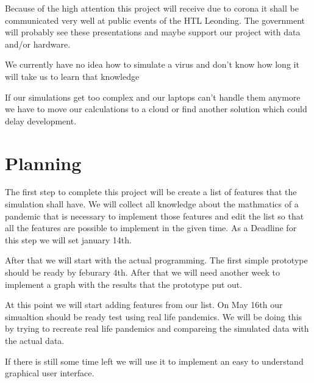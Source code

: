 \documentclass[12pt]{article}
\theoremstyle{definition}
\begin{document}
Because of the high attention this project will receive due to corona it shall be communicated very well at public events of the HTL Leonding.
The government will probably see these presentations and maybe support our project with data and/or hardware.

We currently have no idea how to simulate a virus and don't know how long it will take us to learn that knowledge

If our simulations get too complex and our laptops can't handle them anymore we have to move our calculations to a cloud or find another solution which could delay development.

\pagebreak
\section{Planning}

The first step to complete this project will be create a list of features that the simulation shall have.
We will collect all knowledge about the mathmatics of a pandemic that is necessary to implement those features and edit the list so that all the features are possible to implement in the given time.
As a Deadline for this step we will set january 14th. 

After that we will start with the actual programming.
The first simple prototype should be ready by feburary 4th. After that we will need another week to implement a graph with the results that the prototype put out.


At this point we will start adding features from our list. On May 16th our simualtion should be ready test using real life pandemics. 
We will be doing this by trying to recreate real life pandemics and compareing the simulated data with the actual data.


If there is still some time left we will use it to implement an easy to understand graphical user interface.
\end{document}
